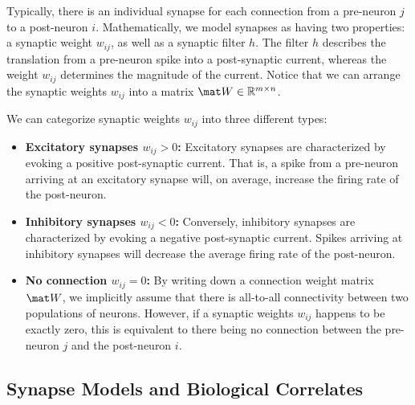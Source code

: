 \documentclass[10pt,letterpaper,oneside]{article}
\begin{document}
	Typically, there is an individual synapse for each connection from a pre-neuron $j$ to a post-neuron $i$. Mathematically, we model synapses as having two properties: a synaptic weight $w_{ij}$, as well as a synaptic filter $h$. The filter $h$ describes the translation from a pre-neuron spike into a post-synaptic current, whereas the weight $w_{ij}$ determines the magnitude of the current. Notice that we can arrange the synaptic weights $w_{ij}$ into a matrix $\mat W \in \mathbb{R}^{m \times n}$.

	We can categorize synaptic weights $w_{ij}$ into three different types:
	\begin{itemize}
		\item\textbf{Excitatory synapses $w_{ij} > 0$:}
		Excitatory synapses are characterized by evoking a positive post-synaptic current. That is, a spike from a pre-neuron arriving at an excitatory synapse will, on average, increase the firing rate of the post-neuron.
		\item\textbf{Inhibitory synapses $w_{ij} < 0$:}
		Conversely, inhibitory synapses are characterized by evoking a negative post-synaptic current. Spikes arriving at inhibitory synapses will decrease the average firing rate of the post-neuron.
		\item\textbf{No connection $w_{ij} = 0$:}
		By writing down a connection weight matrix $\mat W$, we implicitly assume that there is all-to-all connectivity between two populations of neurons. However, if a synaptic weights $w_{ij}$ happens to be exactly zero, this is equivalent to there being no connection between the pre-neuron $j$ and the post-neuron $i$.
	\end{itemize}


	\subsection{Synapse Models and Biological Correlates}
\end{document}
